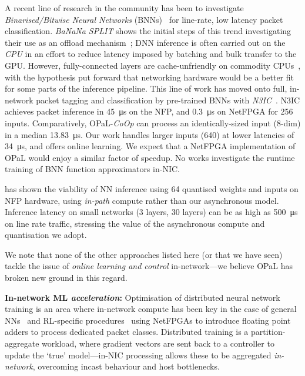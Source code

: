 \documentclass[sigconf,natbib=false]{acmart}
\newcommand{\fakepara}[1]{\noindent\textbf{#1:}}
\newcommand{\approachshort}{OPaL}
\newcommand{\Coopfw}{\emph{CoOp}}
\begin{document}
A recent line of research in the community has been to investigate \emph{Binarised/Bitwise Neural Networks} (BNNs)~\parencite{DBLP:conf/nips/HubaraCSEB16,DBLP:journals/corr/KimS16,DBLP:journals/corr/MiyashitaLM16} for line-rate, low latency packet classification.
\emph{BaNaNa SPLIT} shows the initial steps of this trend investigating their use as an offload mechanism~\parencite{DBLP:conf/sigcomm/SanvitoSB18,DBLP:journals/corr/abs-1801-05731}; DNN inference is often carried out on the \emph{CPU} in an effort to reduce latency imposed by batching and bulk transfer to the GPU.
However, fully-connected layers are cache-unfriendly on commodity CPUs~\parencite{DBLP:conf/sigcomm/SanvitoSB18}, with the hypothesis put forward that networking hardware would be a better fit for some parts of the inference pipeline.
This line of work has moved onto full, in-network packet tagging and classification by pre-trained BNNs with \emph{N3IC}~\parencite{DBLP:journals/corr/abs-2009-02353}.
N3IC achieves packet inference in \SI{45}{\micro\second} on the NFP, and \SI{0.3}{\micro\second} on NetFPGA for \SI{256}{\bit} inputs.
Comparatively, \approachshort{}-\Coopfw{} can process an identically-sized input (8-dim) in a median \SI{13.83}{\micro\second}.
Our work handles larger inputs (\SI{640}{\bit}) at lower latencies of \SI{34}{\micro\second}, and offers online learning.
We expect that a NetFPGA implementation of \approachshort{} would enjoy a similar factor of speedup.
No works investigate the runtime training of BNN function approximators in-NIC.

\textcite{langlet-ml-netronome} has shown the viability of NN inference using \SI{64}{\bit} quantised weights and inputs on NFP hardware, using \emph{in-path} compute rather than our asynchronous model.
Inference latency on small networks (3 layers, \num{30} layers) can be as high as \SI{500}{\micro\second} on line rate traffic, stressing the value of the asynchronous compute and quantisation we adopt.

We note that none of the other approaches listed here (or that we have seen) tackle the issue of \emph{online learning and control} in-network---we believe \approachshort{} has broken new ground in this regard.

\fakepara{In-network ML \emph{acceleration}}
Optimisation of distributed neural network training is an area where in-network compute has been key in the case of general NNs~\parencite{DBLP:conf/micro/LiPAYQPWSEK18} and RL-specific procedures~\parencite{DBLP:conf/isca/LiLYCSH19} using NetFPGAs to introduce floating point adders to process dedicated packet classes.
Distributed training is a partition-aggregate workload, where gradient vectors are sent back to a controller to update the `true' model---in-NIC processing allows these to be aggregated \emph{in-network}, overcoming incast behaviour and host bottlenecks.
\end{document}
